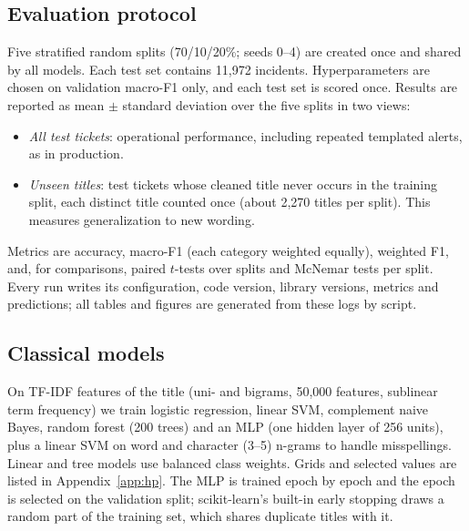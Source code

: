 \documentclass[conference]{IEEEtran}
\begin{document}
\subsection{Evaluation protocol}
Five stratified random splits (70/10/20\%; seeds 0--4) are created once and shared by all models. Each test set
contains 11,972 incidents. Hyperparameters are chosen on validation macro-F1 only, and each test set is scored
once. Results are reported as mean $\pm$ standard deviation over the five splits in two views:
\begin{itemize}
\item \emph{All test tickets}: operational performance, including repeated templated alerts, as in production.
\item \emph{Unseen titles}: test tickets whose cleaned title never occurs in the training split, each distinct
title counted once (about 2,270 titles per split). This measures generalization to new wording.
\end{itemize}
Metrics are accuracy, macro-F1 (each category weighted equally), weighted F1, and, for comparisons, paired
$t$-tests over splits and McNemar tests per split. Every run writes its configuration, code version, library
versions, metrics and predictions; all tables and figures are generated from these logs by script.

\subsection{Classical models}
On TF-IDF features of the title (uni- and bigrams, 50,000 features, sublinear term frequency) we train
logistic regression, linear SVM, complement naive Bayes, random forest (200 trees) and an MLP (one hidden
layer of 256 units), plus a linear SVM on word and character (3--5) n-grams to handle misspellings. Linear and
tree models use balanced class weights. Grids and selected values are listed in Appendix~\ref{app:hp}. The MLP
is trained epoch by epoch and the epoch is selected on the validation split; scikit-learn's built-in early
stopping draws a random part of the training set, which shares duplicate titles with it.
\end{document}
